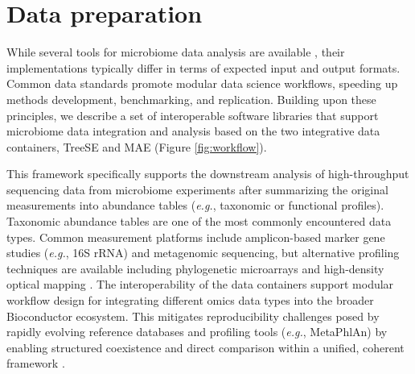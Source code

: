 \documentclass[
  sn-nature,
]{sn-jnl}
\begin{document}
\section{Data preparation}\label{sec-process}

While several tools for microbiome data analysis are available
\citep{jeganathan2021, willis2019, marcoszambrano2023}, their
implementations typically differ in terms of expected input and output
formats. Common data standards promote modular data science workflows,
speeding up methods development, benchmarking, and replication. Building
upon these principles, we describe a set of interoperable software
libraries that support microbiome data integration and analysis based on
the two integrative data containers, TreeSE and MAE (Figure
\ref{fig:workflow}).

This framework specifically supports the downstream analysis of
high-throughput sequencing data from microbiome experiments after
summarizing the original measurements into abundance tables
(\emph{e.g.}, taxonomic or functional profiles). Taxonomic abundance
tables are one of the most commonly encountered data types. Common
measurement platforms include amplicon-based marker gene studies
(\emph{e.g.}, 16S rRNA) and metagenomic sequencing, but alternative
profiling techniques are available including phylogenetic microarrays
\citep{rajilicstojanovic2009} and high-density optical mapping
\citep{abakumov2024}. The interoperability of the data containers
support modular workflow design for integrating different omics data
types into the broader Bioconductor ecosystem. This mitigates
reproducibility challenges posed by rapidly evolving reference databases
and profiling tools (\emph{e.g.}, MetaPhlAn) by enabling structured
coexistence and direct comparison within a unified, coherent framework
\citep{blanco2023, truong2015}.
\end{document}
